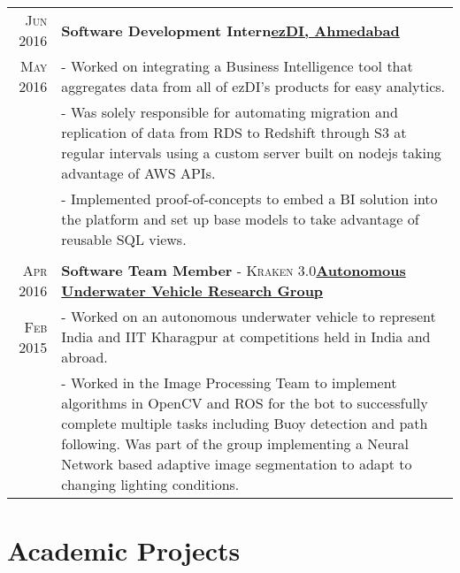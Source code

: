 \documentclass[a4paper,10pt]{extarticle} %
\begin{document}
\begin{tabular}{r|p{17.5cm}}

\textsc{Jun 2016} & \textbf{Software Development Intern}\hfill\textbf{\href{http://www.ezdi.com/}{ezDI, Ahmedabad}}\\
\textsc{May 2016}& \footnotesize{- Worked on integrating a Business Intelligence tool that aggregates data from all of ezDI's products for easy analytics.}\\
& \footnotesize{- Was solely responsible for automating migration and replication of data from RDS to Redshift through S3 at regular intervals using a custom server built on nodejs taking advantage of AWS APIs.}\\
& \footnotesize{- Implemented proof-of-concepts to embed a BI solution into the platform and set up base models to take advantage of reusable SQL views.}\\
\multicolumn{2}{c}{} \\

\textsc{Apr 2016} & \textbf{Software Team Member} \textsc{- Kraken 3.0}\hfill\textbf{\href{http://auv-iitkgp.in/}{Autonomous Underwater Vehicle Research Group}}\\
\textsc{Feb 2015} & \footnotesize{- Worked on an autonomous underwater vehicle to represent India and IIT Kharagpur at competitions held in India and abroad.}\\
& \footnotesize{- Worked in the Image Processing Team to implement algorithms in OpenCV and ROS for the bot to successfully complete multiple tasks including Buoy detection and path following. Was part of the group implementing a Neural Network based adaptive image segmentation to adapt to changing lighting conditions.}
\end{tabular}



\section{Academic Projects}
\end{document}
